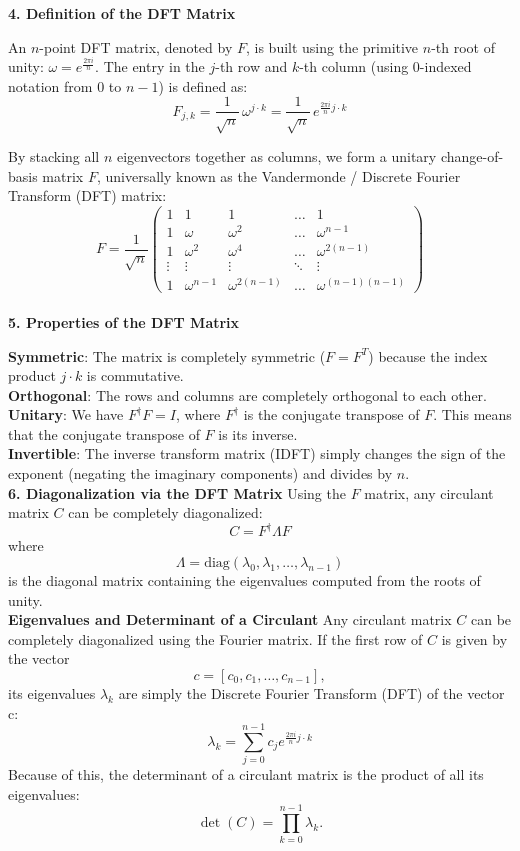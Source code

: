 {\bf 4. Definition of the DFT Matrix}

An $n$-point DFT matrix, denoted by $F$, is built using the primitive $n$-th root of unity: $\omega  =e^{\frac{2\pi i}{n}}$.
The entry in the $j$-th row and $k$-th column (using 0-indexed notation from $0$ to $n-1$) is defined as: \[F_{j,k} = \frac{1}{\sqrt{n}}\, \omega^{j\cdot k} = \frac{1}{\sqrt{n}}\, e^{\frac{2\pi i}{n} j\cdot k }\]

By stacking all \(n\) eigenvectors together as columns, we form a unitary change-of-basis matrix \(F\), universally known as the Vandermonde / Discrete Fourier Transform (DFT) matrix:
\[F = \frac{1}{\sqrt{n}} 
\left(\begin{matrix}1&1&1&\dots &1\\ 
1&\omega &\omega^{2}&\dots &\omega^{n-1}\\ 
1&\omega^{2}&\omega^{4}&\dots &\omega^{2(n-1)}\\ 
\vdots &\vdots &\vdots &\ddots &\vdots \\ 
1&\omega^{n-1}&\omega^{2(n-1)}&\dots &\omega^{(n-1)(n-1)}
\end{matrix}\right)\] \\

{\bf 5. Properties of the DFT Matrix}

{\bf Symmetric}: 
The matrix is completely symmetric (\(F = F^T\)) because the index product $j\cdot k$ is commutative.\\

{\bf Orthogonal}: The rows and columns are completely orthogonal to each other.\\ 

{\bf Unitary}: We have  \(F^\dagger F = I\), where \(F^{\dag }\) is the conjugate transpose of \(F\). This means that
the conjugate transpose of $F$ is its inverse.\\ 

{\bf Invertible}: The inverse transform matrix (IDFT) simply changes the sign of the exponent (negating the imaginary components) and divides by $n$.\\

{\bf 6. Diagonalization via the DFT Matrix}
Using the $F$ matrix, any circulant matrix \(C\) can be completely diagonalized:
\[C=F^{\dag }\Lambda F\]
where  \[\Lambda = \text{diag}(\lambda_0, \lambda_1, \dots, \lambda_{n-1})\] is the diagonal matrix containing the eigenvalues computed from the roots of unity.\\

{\bf Eigenvalues and Determinant of a Circulant}
Any circulant matrix $C$ can be completely diagonalized using the Fourier matrix. If the first row of $C$ is given by the vector 
\[c = [c_0, c_1, \dots, c_{n-1}],\] 
its eigenvalues \(\lambda _{k}\) are simply the Discrete Fourier Transform (DFT) of the vector c:
\[\lambda _{k}=\sum _{j=0}^{n-1}c_{j} e^{\frac{2\pi i}{n} j\cdot k } \]
Because of this, the determinant of a circulant matrix is the product of all its eigenvalues:
\[\det (C)=\prod _{k=0}^{n-1}\lambda _{k}.\]